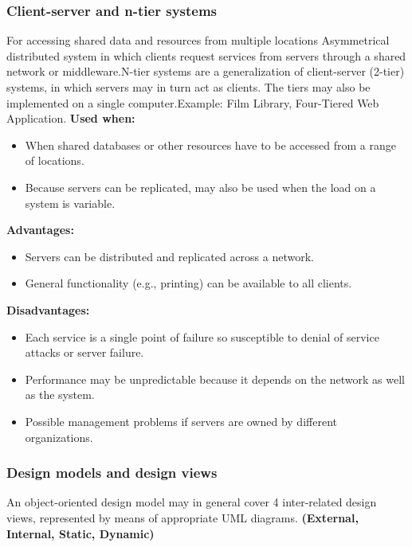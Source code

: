 \documentclass[../ESOF_notes.tex]{subfiles}
\begin{document}
\subsubsection{Client-server and n-tier systems}
For accessing shared data and resources from multiple locations \newline \newline
Asymmetrical distributed system in which clients request services from servers through a shared network or middleware.\newline N-tier systems are a generalization of client-server (2-tier) systems, in which servers may in turn act as clients. The tiers may also be implemented on a single computer.\newline Example: Film Library, Four-Tiered Web Application.\newline\newline
\textbf{Used when:}
\begin{itemize}
    \item When shared databases or other resources have to be accessed from a range of locations.
    \item Because servers can be replicated, may also be used when the load on a system is variable.
\end{itemize}
\textbf{Advantages:}
\begin{itemize}
    \item Servers can be distributed and replicated across a network.
    \item General functionality (e.g., printing) can be available to all clients.
\end{itemize}
\textbf{Disadvantages:}
\begin{itemize}
    \item Each service is a single point of failure so susceptible to denial of service attacks or server failure.
    \item Performance may be unpredictable because it depends on the network as well as the system.
    \item Possible management problems if servers are owned by different organizations.
\end{itemize}

\subsubsection{Design models and design views}
An object-oriented design model may in general cover 4 inter-related design views, represented by means of appropriate UML diagrams. \textbf{(External, Internal, Static, Dynamic)}
\end{document}
